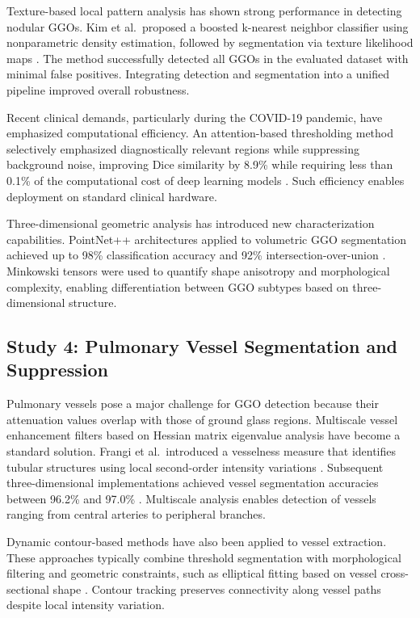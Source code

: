 Texture-based local pattern analysis has shown strong performance in detecting nodular GGOs. Kim et al.\ proposed a boosted k-nearest
neighbor classifier using nonparametric density estimation, followed by segmentation via texture likelihood maps \cite{pubmed2007}.
The method successfully detected all GGOs in the evaluated dataset with minimal false positives. Integrating detection and
segmentation into a unified pipeline improved overall robustness.

Recent clinical demands, particularly during the COVID-19 pandemic, have emphasized computational efficiency. An attention-based
thresholding method selectively emphasized diagnostically relevant regions while suppressing background noise, improving Dice
similarity by 8.9\% while requiring less than 0.1\% of the computational cost of deep learning models \cite{sciencedirect2022}.
Such efficiency enables deployment on standard clinical hardware.

Three-dimensional geometric analysis has introduced new characterization capabilities. PointNet++ architectures applied to volumetric
GGO segmentation achieved up to 98\% classification accuracy and 92\% intersection-over-union \cite{plos2022}. Minkowski tensors
were used to quantify shape anisotropy and morphological complexity, enabling differentiation between GGO subtypes based on
three-dimensional structure.

\subsection{Study 4: Pulmonary Vessel Segmentation and Suppression}

Pulmonary vessels pose a major challenge for GGO detection because their attenuation values overlap with those of ground glass
regions. Multiscale vessel enhancement filters based on Hessian matrix eigenvalue analysis have become a standard solution. Frangi
et al.\ introduced a vesselness measure that identifies tubular structures using local second-order intensity variations \cite{frangi1998}.
Subsequent three-dimensional implementations achieved vessel segmentation accuracies between 96.2\% and 97.0\% \cite{pmc2008}.
Multiscale analysis enables detection of vessels ranging from central arteries to peripheral branches.

Dynamic contour-based methods have also been applied to vessel extraction. These approaches typically combine threshold segmentation
with morphological filtering and geometric constraints, such as elliptical fitting based on vessel cross-sectional shape \cite{pmc2021}.
Contour tracking preserves connectivity along vessel paths despite local intensity variation.

